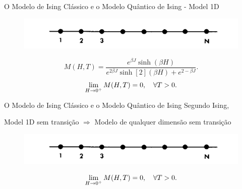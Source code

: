 \documentclass[10pt]{beamer}
\begin{document}
\begin{frame}{O Modelo de Ising Clássico e o Modelo Quântico de Ising}
	- Model 1D 
	\begin{figure}[h]
		\center
		\includegraphics[scale=.3]{1dIsing.png}
	\end{figure}
	
	\begin{equation}
		M(H, T) = \frac{e^{\beta J} \sinh(\beta H)}{e^{2\beta J}\sinh[2](\beta H) + e^{2-\beta J}}.	
	\end{equation}		
	\begin{equation*}
		\lim_{H \to 0^+} M(H, T) = 0 \qc \forall T > 0.
	\end{equation*}
	
\end{frame}


\begin{frame}{O Modelo de Ising Clássico e o Modelo Quântico de Ising}
	Segundo Ising, \\
	
	\begin{center}
		Model 1D sem transição $\Rightarrow$ Modelo de qualquer dimensão sem transição 
	\end{center}
	\begin{figure}[h]
		\center
		\includegraphics[scale=.3]{1dIsing.png}
	\end{figure}
	
	\begin{equation*}
		\lim_{H \to 0^+} M(H, T) = 0 \qc \forall T > 0.
	\end{equation*}
	
\end{frame}
\end{document}
